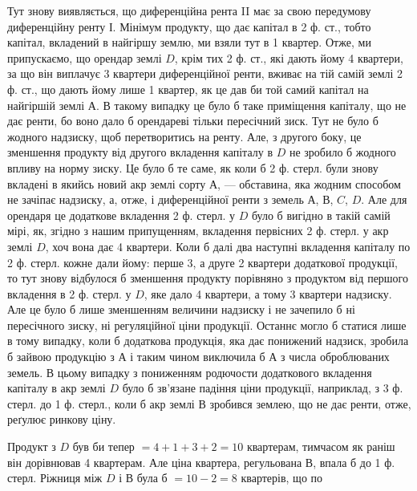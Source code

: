 Тут знову виявляється, що диференційна рента II має за свою передумову
диференційну ренту І. Мінімум продукту, що дає капітал в 2 ф. ст.,
тобто капітал, вкладений в найгіршу землю, ми взяли тут в 1 квартер.
Отже, ми припускаємо, що орендар землі $D$, крім тих 2 ф. ст., які
дають йому 4 квартери, за що він виплачує 3 квартери диференційної ренти, вживає
на тій самій землі 2 ф. ст., що дають йому лише 1 квартер, як це дав
би той самий капітал на
найгіршій землі $А$. В такому випадку це було б таке приміщення капіталу,
що не дає ренти, бо воно дало б орендареві тільки пересічний зиск. Тут не
було б жодного надзиску, щоб перетворитись на ренту. Але, з другого боку, це
зменшення продукту від другого вкладення капіталу в $D$ не зробило б жодного
впливу на норму зиску. Це було б те саме, як коли б 2 ф. стерл. були
знову вкладені в якийсь новий акр землі сорту $А$, — обставина, яка жодним способом
не зачіпає надзиску, а, отже, і диференційної ренти з земель $А$, $В$, $C$, $D$.
Але для орендаря це додаткове вкладення 2 ф. стерл. у $D$ було б вигідно
в такій самій мірі, як, згідно з нашим припущенням, вкладення первісних
2 ф. стерл. у акр землі $D$, хоч вона дає 4 квартери. Коли б далі два наступні
вкладення капіталу по 2 ф. стерл. кожне дали йому: перше 3, а друге
2 квартери додаткової продукції, то тут знову відбулося б зменшення продукту
порівняно з продуктом від першого вкладення в 2 ф. стерл. у $D$, яке
дало 4 квартери, а тому 3 квартери надзиску. Але це було б лише зменшенням
величини надзиску і не зачепило б ні пересічного зиску, ні регуляційної ціни
продукції. Останнє могло б статися лише в тому випадку, коли б додаткова
продукція, яка дає понижений надзиск, зробила б зайвою продукцію з $А$ і таким
чином виключила б $А$ з числа оброблюваних земель. В цьому випадку
з пониженням родючости додаткового вкладення капіталу в акр землі $D$ було б
зв’язане падіння ціни продукції, наприклад, з 3 ф. стерл. до 1 ф. стерл.,
коли б акр землі $В$ зробився землею, що не дає ренти, отже, реґулює ринкову ціну.

Продукт з $D$ був би тепер $= 4 + 1 + 3 + 2 = 10$ квартерам, тимчасом
як раніш він дорівнював 4 квартерам. Але ціна квартера, регульована $В$, впала б
до 1 ф. стерл. Ріжниця між $D$ і $В$ була б $= 10 - 2 = 8$ квартерів, що по
\parbreak{}  %
